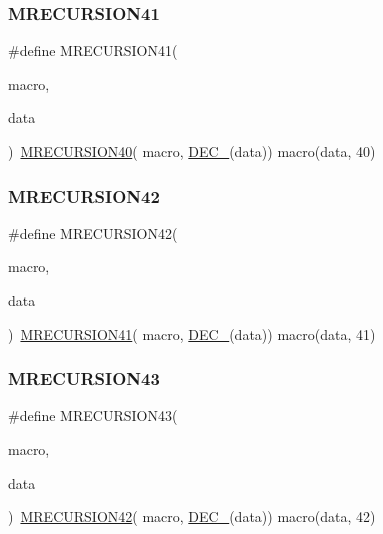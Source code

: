 \subsubsection{\texorpdfstring{MRECURSION41}{MRECURSION41}}
{\footnotesize\ttfamily \#define M\+R\+E\+C\+U\+R\+S\+I\+O\+N41(\begin{DoxyParamCaption}\item[{}]{macro,  }\item[{}]{data }\end{DoxyParamCaption})~\mbox{\hyperlink{group__group__sam0__utils__mrecursion_gae9edc373382a06fbc22889a81e2cd6eb}{M\+R\+E\+C\+U\+R\+S\+I\+O\+N40}}(  macro, \mbox{\hyperlink{group__group__sam0__utils__mrecursion_ga1d23d683797679dca8c3512a54a5dcae}{D\+E\+C\+\_\+}}(data))   macro(data, 40)}

\mbox{\label{group__group__sam0__utils__mrecursion_ga5190bae99648624874678a2bbde2cfb9}} 
\subsubsection{\texorpdfstring{MRECURSION42}{MRECURSION42}}
{\footnotesize\ttfamily \#define M\+R\+E\+C\+U\+R\+S\+I\+O\+N42(\begin{DoxyParamCaption}\item[{}]{macro,  }\item[{}]{data }\end{DoxyParamCaption})~\mbox{\hyperlink{group__group__sam0__utils__mrecursion_ga18ead39c9c6dcb6c6f62f3d140bd650b}{M\+R\+E\+C\+U\+R\+S\+I\+O\+N41}}(  macro, \mbox{\hyperlink{group__group__sam0__utils__mrecursion_ga1d23d683797679dca8c3512a54a5dcae}{D\+E\+C\+\_\+}}(data))   macro(data, 41)}

\mbox{\label{group__group__sam0__utils__mrecursion_ga33387af8b5d03268b41df40ecb0523db}} 
\subsubsection{\texorpdfstring{MRECURSION43}{MRECURSION43}}
{\footnotesize\ttfamily \#define M\+R\+E\+C\+U\+R\+S\+I\+O\+N43(\begin{DoxyParamCaption}\item[{}]{macro,  }\item[{}]{data }\end{DoxyParamCaption})~\mbox{\hyperlink{group__group__sam0__utils__mrecursion_ga5190bae99648624874678a2bbde2cfb9}{M\+R\+E\+C\+U\+R\+S\+I\+O\+N42}}(  macro, \mbox{\hyperlink{group__group__sam0__utils__mrecursion_ga1d23d683797679dca8c3512a54a5dcae}{D\+E\+C\+\_\+}}(data))   macro(data, 42)}

